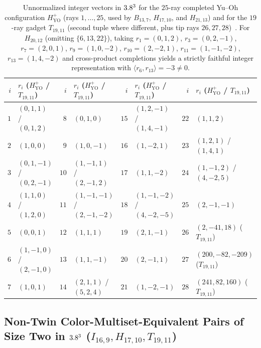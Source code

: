 \documentclass[aps,pra,reprint,superscriptaddress,longbibliography,nofootinbib,floatfix,10pt]{revtex4-2}
\theoremstyle{definition}\newtheorem{definition}[theorem]{Definition}
\theoremstyle{remark}\newtheorem{remark}[theorem]{Remark}
\newcommand{\YO}{\mathrm{YO}}\newcommand{\ip}[2]{\langle #1,#2\rangle}
\begin{document}
\begin{table}[t]
\caption{Unnormalized integer vectors in $3.8^3$ for the $25$-ray completed Yu--Oh configuration $H_{\YO}^+$ (rays $1,\ldots,25$, used by $B_{13,7}$, $H_{17,10}$, and $H_{21,13}$) and for the $19$-ray gadget $T_{19,11}$ (second tuple where different, plus tip rays $26,27,28$)~\cite{svozil2026contexts,supplement}. For $H_{20,12}$ (omitting $\{6,13,22\}$), taking $r_1=(0,1,2)$, $r_3=(0,2,-1)$, $r_7=(2,0,1)$, $r_9=(1,0,-2)$, $r_{10}=(2,-2,1)$, $r_{11}=(1,-1,-2)$, $r_{13}=(1,4,-2)$ and cross-product completions yields a strictly faithful integer representation with $\ip{r_6}{r_{13}}=-3\neq 0$.}\label{tab:yo-vectors}
\footnotesize
\begin{ruledtabular}
\begin{tabular}{rl@{\quad}rl@{\quad}rl@{\quad}rl}
$i$ & $r_i$ ($H_{\YO}^+$ / $T_{19,11}$) & $i$ & $r_i$ ($H_{\YO}^+$ / $T_{19,11}$) & $i$ & $r_i$ ($H_{\YO}^+$ / $T_{19,11}$) & $i$ & $r_i$ ($H_{\YO}^+$ / $T_{19,11}$)\\\hline
$1$ & $(0,1,1)$ / $(0,1,2)$ & $8$ & $(0,1,0)$ & $15$ & $(1,2,-1)$ / $(1,4,-1)$ & $22$ & $(1,1,2)$\\
$2$ & $(1,0,0)$ & $9$ & $(1,0,-1)$ & $16$ & $(1,-2,1)$ & $23$ & $(1,2,1)$ / $(1,4,1)$\\
$3$ & $(0,1,-1)$ / $(0,2,-1)$ & $10$ & $(1,-1,1)$ / $(2,-1,2)$ & $17$ & $(1,1,-2)$ & $24$ & $(1,-1,2)$ / $(4,-2,5)$\\
$4$ & $(1,1,0)$ / $(1,2,0)$ & $11$ & $(1,-1,-1)$ / $(2,-1,-2)$ & $18$ & $(1,-1,-2)$ / $(4,-2,-5)$ & $25$ & $(2,-1,-1)$\\
$5$ & $(0,0,1)$ & $12$ & $(1,1,1)$ & $19$ & $(2,1,-1)$ & $26$ & $(2,-41,18)$ ($T_{19,11}$)\\
$6$ & $(1,-1,0)$ / $(2,-1,0)$ & $13$ & $(1,1,-1)$ & $20$ & $(2,-1,1)$ & $27$ & $(200,-82,-209)$ ($T_{19,11}$)\\
$7$ & $(1,0,1)$ & $14$ & $(2,1,1)$ / $(5,2,4)$ & $21$ & $(1,-2,-1)$ & $28$ & $(241,82,160)$ ($T_{19,11}$)\\
\end{tabular}
\end{ruledtabular}
\end{table}

\subsection{Non-Twin Color-Multiset-Equivalent Pairs of Size Two in \texorpdfstring{$3.8^3$}{R3} (\texorpdfstring{$I_{16,9},H_{17,10},T_{19,11}$}{I16,9, H17,10, T19,11})}\label{sec:size2-real}
\end{document}

